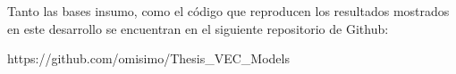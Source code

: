 

Tanto las bases insumo, como el código que reproducen los resultados mostrados en este desarrollo se encuentran en el siguiente repositorio de Github:\bigskip

https://github.com/omisimo/Thesis\_VEC\_Models
